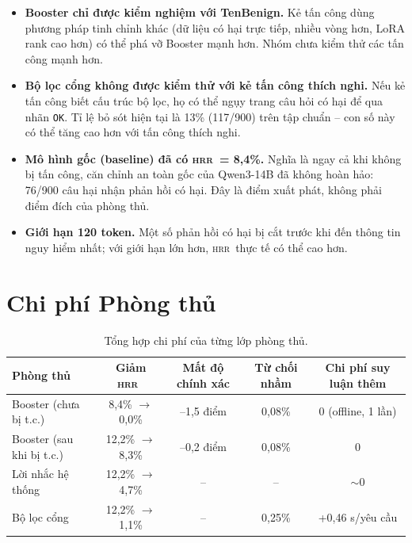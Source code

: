 \documentclass[11pt]{article}
\newenvironment{compactitem}{\begin{itemize}\setlength{\itemsep}{1pt}\setlength{\parskip}{0pt}}{\end{itemize}}
\newcommand{\HRR}{\textsc{hrr}}   %
\begin{document}
\begin{compactitem}
  \item \textbf{Booster chỉ được kiểm nghiệm với TenBenign.} Kẻ tấn công dùng phương pháp tinh
  chỉnh khác (dữ liệu có hại trực tiếp, nhiều vòng hơn, LoRA rank cao hơn) có thể phá vỡ Booster
  mạnh hơn. Nhóm chưa kiểm thử các tấn công mạnh hơn.

  \item \textbf{Bộ lọc cổng không được kiểm thử với kẻ tấn công thích nghi.} Nếu kẻ tấn công
  biết cấu trúc bộ lọc, họ có thể ngụy trang câu hỏi có hại để qua nhãn \texttt{OK}. Tỉ lệ bỏ
  sót hiện tại là 13\% (117/900) trên tập chuẩn -- con số này có thể tăng cao hơn với tấn công
  thích nghi.

  \item \textbf{Mô hình gốc (baseline) đã có \HRR\ = 8,4\%.} Nghĩa là ngay cả khi không bị tấn
  công, căn chỉnh an toàn gốc của Qwen3-14B đã không hoàn hảo: 76/900 câu hại nhận phản hồi có
  hại. Đây là điểm xuất phát, không phải điểm đích của phòng thủ.

  \item \textbf{Giới hạn 120 token.} Một số phản hồi có hại bị cắt trước khi đến thông tin nguy
  hiểm nhất; với giới hạn lớn hơn, \HRR\ thực tế có thể cao hơn.
\end{compactitem}

\section{Chi phí Phòng thủ}
\label{sec:cost}

\begin{table}[h]
  \centering
  \caption{Tổng hợp chi phí của từng lớp phòng thủ.}
  \label{tab:cost}
  \small
  \begin{tabular}{@{}lcccc@{}}
    \toprule
    Phòng thủ & Giảm \HRR\ & Mất độ chính xác & Từ chối nhầm & Chi phí suy luận thêm \\
    \midrule
    Booster (chưa bị t.c.)   & 8,4\% $\to$ 0,0\%   & --1,5 điểm & 0,08\% & 0 (offline, 1 lần) \\
    Booster (sau khi bị t.c.) & 12,2\% $\to$ 8,3\%  & --0,2 điểm & 0,08\% & 0 \\
    Lời nhắc hệ thống         & 12,2\% $\to$ 4,7\%  & --          & --     & $\sim$0 \\
    Bộ lọc cổng               & 12,2\% $\to$ 1,1\%  & --          & 0,25\% & +0,46 s/yêu cầu \\
    \bottomrule
  \end{tabular}
\end{table}
\end{document}
